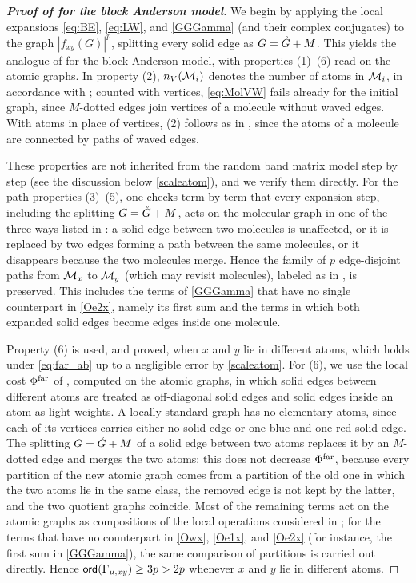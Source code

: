 \begin{proof}[\bf Proof of  for the block Anderson model]
We begin by applying the local expansions \eqref{eq:BE}, \eqref{eq:LW}, and \eqref{GGGamma} (and their complex conjugates) to the graph $|f_{xy}(G)|^p$, splitting every solid edge as $G={\mathring G}+M$. This yields the analogue of  for the block Anderson model, with properties (1)--(6) read on the atomic graphs. In property (2), $n_V(\mathcal{M}_i)$ denotes the number of atoms in $\mathcal{M}_i$, in accordance with ; counted with vertices, \eqref{eq:MolVW} fails already for the initial graph, since $M$-dotted edges join vertices of a molecule without waved edges. With atoms in place of vertices, (2) follows as in , since the atoms of a molecule are connected by paths of waved edges.

These properties are not inherited from the random band matrix model step by step (see the discussion below \eqref{scaleatom}), and we verify them directly. For the path properties (3)--(5), one checks term by term that every expansion step, including the splitting $G={\mathring G}+M$, acts on the molecular graph in one of the three ways listed in : a solid edge between two molecules is unaffected, or it is replaced by two edges forming a path between the same molecules, or it disappears because the two molecules merge. Hence the family of $p$ edge-disjoint paths from $\mathcal{M}_x$ to $\mathcal{M}_y$ (which may revisit molecules), labeled as in , is preserved. This includes the terms of \eqref{GGGamma} that have no single counterpart in \eqref{Oe2x}, namely its first sum and the terms in which both expanded solid edges become edges inside one molecule.

Property (6) is used, and proved, when $x$ and $y$ lie in different atoms, which holds under \eqref{eq:far_ab} up to a negligible error by \eqref{scaleatom}. For (6), we use the local cost $\Phi^{\rm far}$ of , computed on the atomic graphs, in which solid edges between different atoms are treated as off-diagonal solid edges and solid edges inside an atom as light-weights. A locally standard graph has no elementary atoms, since each of its vertices carries either no solid edge or one blue and one red solid edge. The splitting $G={\mathring G}+M$ of a solid edge between two atoms replaces it by an $M$-dotted edge and merges the two atoms; this does not decrease $\Phi^{\rm far}$, because every partition of the new atomic graph comes from a partition of the old one in which the two atoms lie in the same class, the removed edge is not kept by the latter, and the two quotient graphs coincide. Most of the remaining terms act on the atomic graphs as compositions of the local operations considered in ; for the terms that have no counterpart in \eqref{Owx}, \eqref{Oe1x}, and \eqref{Oe2x} (for instance, the first sum in \eqref{GGGamma}), the same comparison of partitions is carried out directly. Hence ${\mathsf{ord}}(\Gamma_{\mu,xy})\ge 3p>2p$ whenever $x$ and $y$ lie in different atoms.





\end{proof}
